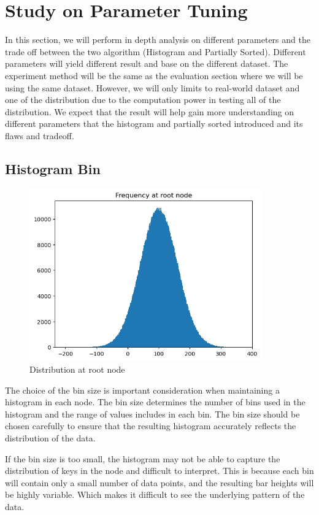
\chapter{Study on Parameter Tuning}
In this section, we will perform in depth analysis on different parameters and the trade off between the two algorithm (Histogram and Partially Sorted). Different parameters will yield different result and base on the different dataset. The experiment method will be the same as the evaluation section where we will be using the same dataset. However, we will only limits to real-world dataset and one of the distribution due to the computation power in testing all of the distribution. We expect that the result will help gain more understanding on different parameters that the histogram and partially sorted introduced and its flaws and tradeoff.

\section{Histogram Bin} \label{Histogram Bin}
\begin{figure}[H]
    \centering
    \includegraphics[width=100mm,scale=1]{Figures/GaussianDistributionRootNode.png}
    \caption{
     Distribution at root node
    }
    \label{fig:DistRootNode}
\end{figure}
The choice of the bin size is important consideration when maintaining a histogram in each node. The bin size determines the number of bins used in the histogram and the range of values includes in each bin. The bin size should be chosen carefully to ensure that the resulting histogram accurately reflects the distribution of the data. 

If the bin size is too small, the histogram may not be able to capture the distribution of keys in the node and difficult to interpret. This is because each bin will contain only a small number of data points, and the resulting bar heights will be highly variable. Which makes it difficult to see the underlying pattern of the data.  


